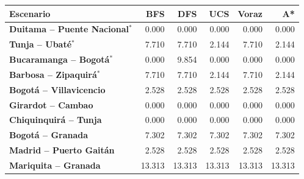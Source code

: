 \renewcommand{\arraystretch}{1.2}
\begin{tabular}{|l|r|r|r|r|r|}
\hline
\rowcolor{gray!20} \textbf{Escenario} & \textbf{BFS} & \textbf{DFS} & \textbf{UCS} & \textbf{Voraz} & \textbf{A*} \\
\hline
\textbf{Duitama -- Puente Nacional$^{*}$} & 0.000 & 0.000 & 0.000 & 0.000 & 0.000 \\
\hline
\textbf{Tunja -- Ubaté$^{*}$} & 7.710 & 7.710 & 2.144 & 7.710 & 2.144 \\
\hline
\textbf{Bucaramanga -- Bogotá$^{*}$} & 0.000 & 9.854 & 0.000 & 0.000 & 0.000 \\
\hline
\textbf{Barbosa -- Zipaquirá$^{*}$} & 7.710 & 7.710 & 2.144 & 7.710 & 2.144 \\
\hline
\textbf{Bogotá -- Villavicencio} & 2.528 & 2.528 & 2.528 & 2.528 & 2.528 \\
\hline
\textbf{Girardot -- Cambao} & 0.000 & 0.000 & 0.000 & 0.000 & 0.000 \\
\hline
\textbf{Chiquinquirá -- Tunja} & 0.000 & 0.000 & 0.000 & 0.000 & 0.000 \\
\hline
\textbf{Bogotá -- Granada} & 7.302 & 7.302 & 7.302 & 7.302 & 7.302 \\
\hline
\textbf{Madrid -- Puerto Gaitán} & 2.528 & 2.528 & 2.528 & 2.528 & 2.528 \\
\hline
\textbf{Mariquita -- Granada} & 13.313 & 13.313 & 13.313 & 13.313 & 13.313 \\
\hline
\end{tabular}
